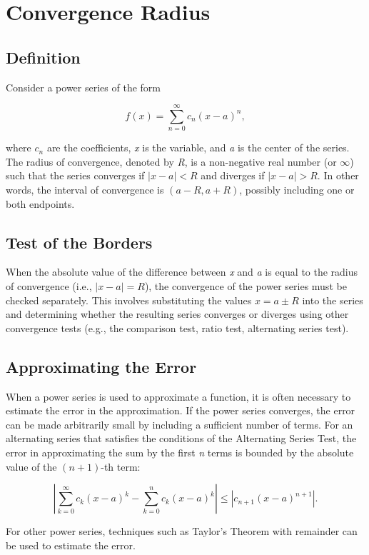 \newpage
\section{Convergence Radius}

\subsection{Definition}

Consider a power series of the form

\[
    f(x) = \sum_{n=0}^{\infty} c_n {(x - a)}^n,
\]

where \(c_n\) are the coefficients, \emph{x} is the variable, and \emph{a} is the center of the series. The radius of convergence, denoted by \emph{R}, is a non-negative real number (or \(\infty\)) such that the series converges if \(|x - a| < R\) and diverges if \(|x - a| > R\). In other words, the interval of convergence is \((a - R, a + R)\), possibly including one or both endpoints.

\subsection{Test of the Borders}

When the absolute value of the difference between \emph{x} and \emph{a} is equal to the radius of convergence (i.e., \(|x - a| = R\)), the convergence of the power series must be checked separately. This involves substituting the values \(x = a \pm R\) into the series and determining whether the resulting series converges or diverges using other convergence tests (e.g., the comparison test, ratio test, alternating series test).

\subsection{Approximating the Error}

When a power series is used to approximate a function, it is often necessary to estimate the error in the approximation. If the power series converges, the error can be made arbitrarily small by including a sufficient number of terms. For an alternating series that satisfies the conditions of the Alternating Series Test, the error in approximating the sum by the first \emph{n} terms is bounded by the absolute value of the \((n+1)\)-th term:

\[
    \left| \sum_{k=0}^{\infty} c_k {(x - a)}^k - \sum_{k=0}^{n} c_k {(x - a)}^k \right| \leq |c_{n+1} {(x - a)}^{n+1}|.
\]

For other power series, techniques such as Taylor's Theorem with remainder can be used to estimate the error.
